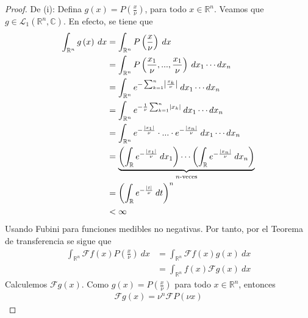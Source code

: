\documentclass[12pt]{report}
\theoremstyle{largebreak}
\newcommand\abs[1]{\ensuremath{\left|#1\right|}}
\newcommand{\fou}[1]{\ensuremath{\mathcal{F}#1}}
\begin{document}
    \begin{proof}
        De (i): Defina $g(x)=P\left(\frac{x}{\nu}\right)$, para todo $x\in\mathbb{R}^n$. Veamos que $g\in\mathcal{L}_1(\mathbb{R}^n,\mathbb{C})$. En efecto, se tiene que
        \begin{equation*}
            \begin{split}
                \int_{\mathbb{R}^n}g\left(x\right)\:dx&=\int_{\mathbb{R}^n}P\left(\frac{x}{\nu}\right)\:dx\\
                &=\int_{\mathbb{R}^n}P\left(\frac{x_1}{\nu},...,\frac{x_1}{\nu}\right)\:dx_1\cdots dx_n \\
                &=\int_{\mathbb{R}^n}e^{ -\sum_{ k=1}^n\abs{\frac{x_k}{\nu}}}\:dx_1\cdots dx_n\\
                &=\int_{\mathbb{R}^n}e^{ -\frac{1}{\nu}\sum_{ k=1}^n\abs{x_k}}\:dx_1\cdots dx_n\\
                &=\int_{\mathbb{R}^n}e^{-\frac{\abs{x_1}}{\nu}}\cdot...\cdot e^{-\frac{\abs{x_n}}{\nu}}\:dx_1\cdots dx_n\\
                &=\underbrace{\left(\int_{\mathbb{R}}e^{-\frac{\abs{x_1}}{\nu}}\:dx_1\right)\cdots\left(\int_{\mathbb{R}}e^{-\frac{\abs{x_n}}{\nu}}\:dx_n\right)}_{ n\textup{-veces}}\\
                &=\left(\int_{\mathbb{R}}e^{-\frac{\abs{t}}{\nu}}\:dt\right)^n\\
                &<\infty
            \end{split}
        \end{equation*}
        Usando Fubini para funciones medibles no negativas. Por tanto, por el Teorema de transferencia se sigue que
        \begin{equation*}
            \begin{split}
                \int_{\mathbb{R}^n}\fou{f}(x)P\left(\frac{x}{\nu}\right)\:dx&=\int_{\mathbb{R}^n}\fou{f}(x)g(x)\:dx\\
                &=\int_{\mathbb{R}^n}f(x)\fou{g}(x)\:dx
            \end{split}
        \end{equation*}
        Calculemos $\fou{g}(x)$. Como $g(x)=P\left(\frac{x}{\nu}\right)$ para todo $x\in\mathbb{R}^n$, entonces
        \begin{equation*}
            \begin{split}
                \fou{g}(x)=\nu^n\fou{P}(\nu x)
            \end{split}
        \end{equation*}

\end{proof}
\end{document}

